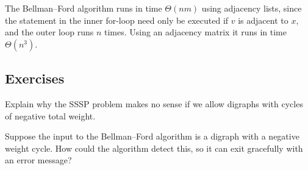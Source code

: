 The Bellman--Ford algorithm runs in time $\Theta(nm)$ using adjacency
lists, since the statement in the inner for-loop need only be
executed if $v$ is adjacent to $x$, and the outer loop runs $n$
times. Using an adjacency matrix it runs in time $\Theta(n^3)$.

\subsection*{Exercises}


\begin{Boxample}[2] \label{ex:SSSP-neg-cycle}
Explain why the SSSP problem makes no sense if we allow digraphs with
cycles of negative total weight.
\end{Boxample}


\begin{Boxample}[2]\label{ex:bellman-neg-cycle}
Suppose the input to the Bellman--Ford algorithm is a digraph with a
negative weight cycle. How could the algorithm detect this, so it can
exit gracefully with an error message?
\end{Boxample}


